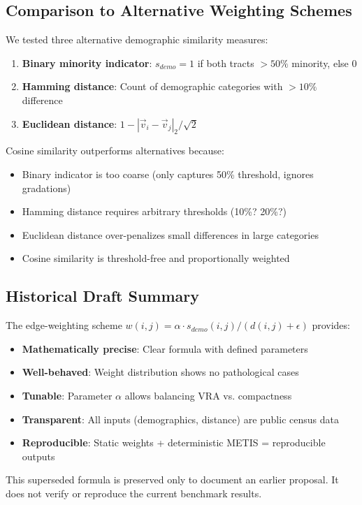 \subsection{Comparison to Alternative Weighting Schemes}

We tested three alternative demographic similarity measures:

\begin{enumerate}
\item \textbf{Binary minority indicator}: $s_{demo} = 1$ if both tracts $> 50\%$ minority, else 0
\item \textbf{Hamming distance}: Count of demographic categories with $> 10\%$ difference
\item \textbf{Euclidean distance}: $1 - |\vec{v}_i - \vec{v}_j|_2 / \sqrt{2}$
\end{enumerate}

Cosine similarity outperforms alternatives because:
\begin{itemize}
\item Binary indicator is too coarse (only captures 50\% threshold, ignores gradations)
\item Hamming distance requires arbitrary thresholds (10\%? 20\%?)
\item Euclidean distance over-penalizes small differences in large categories
\item Cosine similarity is threshold-free and proportionally weighted
\end{itemize}

\subsection{Historical Draft Summary}

The edge-weighting scheme $w(i,j) = \alpha \cdot s_{demo}(i,j) / (d(i,j) + \epsilon)$ provides:
\begin{itemize}
\item \textbf{Mathematically precise}: Clear formula with defined parameters
\item \textbf{Well-behaved}: Weight distribution shows no pathological cases
\item \textbf{Tunable}: Parameter $\alpha$ allows balancing VRA vs. compactness
\item \textbf{Transparent}: All inputs (demographics, distance) are public census data
\item \textbf{Reproducible}: Static weights + deterministic METIS = reproducible outputs
\end{itemize}

This superseded formula is preserved only to document an earlier proposal. It
does not verify or reproduce the current benchmark results.
